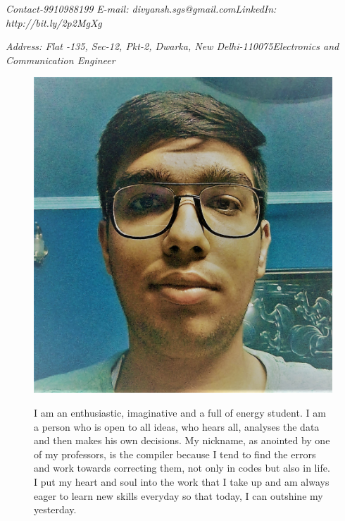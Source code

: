 \documentclass[11pt]{article}
\begin{document}
\textit{Contact-9910988199}                                                 \hspace{2.5cm}\textit{E-mail: divyansh.sgs@gmail.com}\hspace{2.5cm}\textit{LinkedIn: http://bit.ly/2p2MgXg}                           
\begin{mdframed}[backgroundcolor=orange]
\begin{flushright}
\begin{Huge}
\end{Huge}
\end{flushright}
\end{mdframed}

\textit{Address: Flat -135, Sec-12, Pkt-2, Dwarka, New Delhi-110075}\hspace{2.5cm}\textit{Electronics and Communication Engineer}
\begin{figure}[ht]
\begin{minipage}[b]{0.45\linewidth}
\centering
\includegraphics[scale=0.095]{photo.jpg}
\end{minipage}
\hspace{0.5cm}
\begin{minipage}[b]{0.45\linewidth}
\flushleft
I am an enthusiastic, imaginative and a full of energy student. I am a person who is open to all ideas, who hears all, analyses the data and then makes his own decisions. My nickname, as anointed by one of my professors, is the compiler because I tend to find the errors and work towards correcting them, not only in codes but also in life. I put my heart and soul into the work that I take up and am always eager to learn new skills everyday so that today, I can outshine my yesterday.

\end{minipage}
\end{figure}\\
\end{document}
